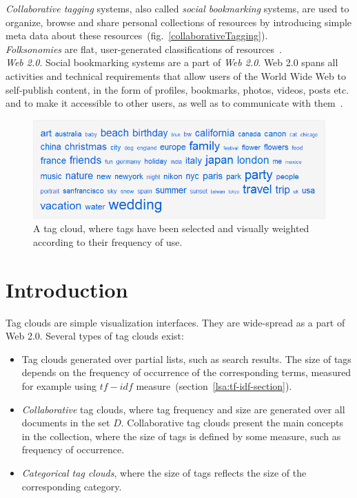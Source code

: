\textit{Collaborative tagging} systems, also called \textit{social bookmarking} systems, are used to organize, browse and share personal collections of resources by introducing simple meta data about these resources~(fig.~\ref{collaborativeTagging}). \\

\textit{Folksonomies} are flat, user-generated classifications of resources~\cite{folksonomiesWeb2.0_2009}. \\

\textit{Web 2.0}. Social bookmarking systems are a part of \textit{Web 2.0}. Web 2.0 spans all activities and technical requirements that allow users of the World Wide Web to self-publish content, in the form of profiles, bookmarks, photos, videos, posts etc. and to make it accessible to other users, as well as to communicate with them~\cite{folksonomiesWeb2.0_2009}. \\

\begin{figure}[htbp]
	\centering
	\includegraphics[width=\ScaleIfNeeded]{img/tagcloud} 
	\caption[A tag cloud.]{A tag cloud, where tags have been selected and visually weighted according to their frequency of use.}
	\label{fig:tagcloud}
\end{figure}

\section{Introduction}
Tag clouds are simple visualization interfaces. They are wide-spread as a part of Web 2.0. Several types of tag clouds exist: \\
\begin{itemize}
\item Tag clouds generated over partial lists, such as search results. The size of tags depends on the frequency of occurrence of the corresponding terms, measured for example using $tf-idf$  measure~(section~\ref{lsa:tf-idf-section}).

\item \textit{Collaborative} tag clouds, where tag frequency and size are generated over all documents in the set $D$. Collaborative tag clouds present the main concepts in the collection, where the size of tags is defined by some measure, such as frequency of occurrence. 

\item \textit{ Categorical tag clouds}, where the size of tags reflects the size of the corresponding category. \\
\end{itemize}

